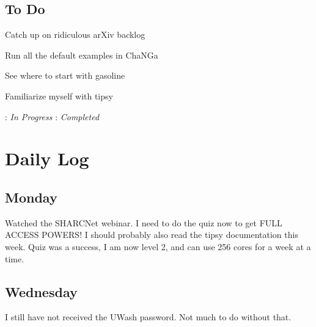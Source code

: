 \documentclass[11pt,letterpaper]{article}
\begin{document}
\subsection*{To Do}
\begin{bullets}
\item[\textleaf] Catch up on ridiculous arXiv backlog
\item[\checkmark] Run all the default examples in ChaNGa
\item See where to start with gasoline
\item Familiarize myself with tipsy
\end{bullets}

\textleaf : \textit{In Progress} \qquad \checkmark : \textit{Completed}

\section*{Daily Log}
\subsection*{Monday}
Watched the SHARCNet webinar.  I need to do the quiz now to get FULL ACCESS 
POWERS!  I should probably also read the tipsy documentation this week.  Quiz
was a success, I am now level 2, and can use 256 cores for a week at a time.
\subsection*{Wednesday}
I still have not received the UWash password.  Not much to do without that.
\end{document}
